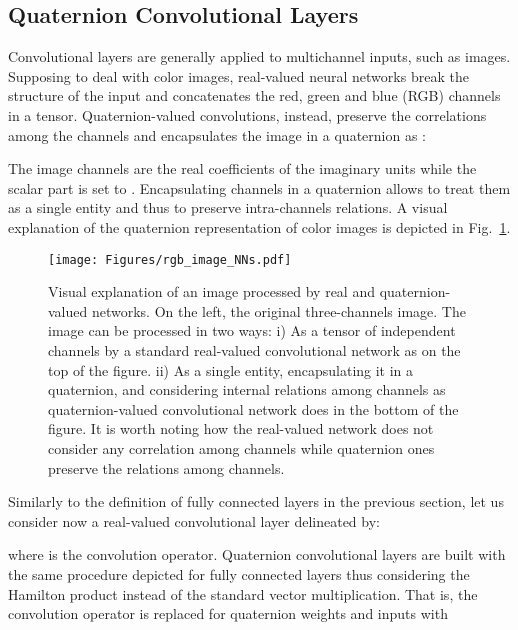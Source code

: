 \documentclass[graybox]{svmult}
\begin{document}
\subsection{Quaternion Convolutional Layers}
\label{sec:qconv}
\noindent Convolutional layers are generally applied to multichannel inputs, such as images. Supposing to deal with color images, real-valued neural networks break the structure of the input and concatenates the red, green and blue (RGB) channels in a tensor. Quaternion-valued convolutions, instead, preserve the correlations among the channels and encapsulates the image in a quaternion as \cite{ParcolletAIR2019, ParcolletICASSP2019a, QilinQCNN2019}:



\noindent The image channels are the real coefficients of the imaginary units while the scalar part is set to . Encapsulating channels in a quaternion allows to treat them as a single entity and thus to preserve intra-channels relations. A visual explanation of the quaternion representation of color images is depicted in Fig.~\ref{fig:rgb_images}.

\begin{figure}
\centering
    \texttt{[image: Figures/rgb\_image\_NNs.pdf]}
\caption{Visual explanation of an  image processed by real and quaternion-valued networks. On the left, the original three-channels image. The image can be processed in two ways: i) As a tensor of independent channels by a standard real-valued convolutional network as on the top of the figure. ii) As a single entity, encapsulating it in a quaternion, and considering internal relations among channels as quaternion-valued convolutional network does in the bottom of the figure. It is worth noting how the real-valued network does not consider any correlation among channels while quaternion ones preserve the relations among channels.}
    \label{fig:rgb_images}
\end{figure}

Similarly to the definition of fully connected layers in the previous section, let us consider now a real-valued convolutional layer delineated by:



\noindent where  is the convolution operator.
Quaternion convolutional layers are built with the same procedure depicted for fully connected layers thus considering the Hamilton product instead of the standard vector multiplication. That is, the convolution operator  is replaced for quaternion weights and inputs with
\end{document}
